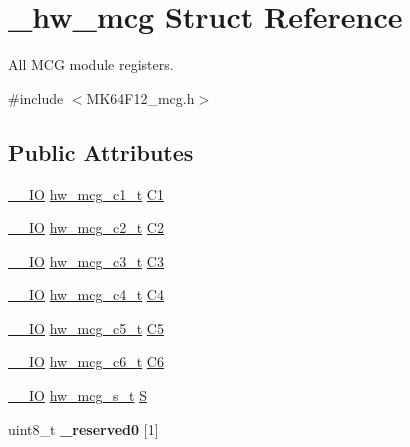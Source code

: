 \hypertarget{struct__hw__mcg}{}\section{\+\_\+hw\+\_\+mcg Struct Reference}
\label{struct__hw__mcg}


All M\+CG module registers.  




{\ttfamily \#include $<$M\+K64\+F12\+\_\+mcg.\+h$>$}

\subsection*{Public Attributes}
\begin{DoxyCompactItemize}
\item 
\hyperlink{core__sc300_8h_aec43007d9998a0a0e01faede4133d6be}{\+\_\+\+\_\+\+IO} \hyperlink{union__hw__mcg__c1}{hw\+\_\+mcg\+\_\+c1\+\_\+t} \hyperlink{struct__hw__mcg_adf43bb2b6727cf97377d741c8312d870}{C1}
\item 
\hyperlink{core__sc300_8h_aec43007d9998a0a0e01faede4133d6be}{\+\_\+\+\_\+\+IO} \hyperlink{union__hw__mcg__c2}{hw\+\_\+mcg\+\_\+c2\+\_\+t} \hyperlink{struct__hw__mcg_a129f106327e63fd0bef6a06045ee2b46}{C2}
\item 
\hyperlink{core__sc300_8h_aec43007d9998a0a0e01faede4133d6be}{\+\_\+\+\_\+\+IO} \hyperlink{union__hw__mcg__c3}{hw\+\_\+mcg\+\_\+c3\+\_\+t} \hyperlink{struct__hw__mcg_a21f69fb0895c94930c5a54ecca21f356}{C3}
\item 
\hyperlink{core__sc300_8h_aec43007d9998a0a0e01faede4133d6be}{\+\_\+\+\_\+\+IO} \hyperlink{union__hw__mcg__c4}{hw\+\_\+mcg\+\_\+c4\+\_\+t} \hyperlink{struct__hw__mcg_acb225f0712236376a4ac3c114608cc97}{C4}
\item 
\hyperlink{core__sc300_8h_aec43007d9998a0a0e01faede4133d6be}{\+\_\+\+\_\+\+IO} \hyperlink{union__hw__mcg__c5}{hw\+\_\+mcg\+\_\+c5\+\_\+t} \hyperlink{struct__hw__mcg_a246c8167c7a24de4150548bb9a118b67}{C5}
\item 
\hyperlink{core__sc300_8h_aec43007d9998a0a0e01faede4133d6be}{\+\_\+\+\_\+\+IO} \hyperlink{union__hw__mcg__c6}{hw\+\_\+mcg\+\_\+c6\+\_\+t} \hyperlink{struct__hw__mcg_a9da61d89dc1c5d463e1f164218a2b4a3}{C6}
\item 
\hyperlink{core__sc300_8h_aec43007d9998a0a0e01faede4133d6be}{\+\_\+\+\_\+\+IO} \hyperlink{union__hw__mcg__s}{hw\+\_\+mcg\+\_\+s\+\_\+t} \hyperlink{struct__hw__mcg_a8d3d2d125103dcbeef3d49aa735205b9}{S}
\item 
uint8\+\_\+t {\bfseries \+\_\+reserved0} \mbox{[}1\mbox{]}\hypertarget{struct__hw__mcg_a23d624a9b9a99eb29a8c8a58b9c3df0a}{}\label{struct__hw__mcg_a23d624a9b9a99eb29a8c8a58b9c3df0a}


\end{DoxyCompactItemize}
